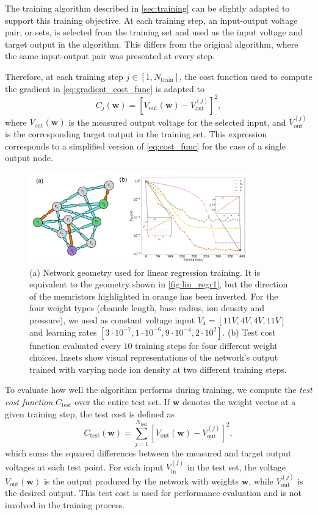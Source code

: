 \documentclass[reprint,superscriptaddress,prb,showkeys]{revtex4-2}
\begin{document}
The training algorithm described in \cref{sec:training} can be slightly adapted to support this training objective. At each training step, an input-output voltage pair, or sets, is selected from the training set and used as the input voltage and target output in the algorithm. This differs from the original algorithm, where the same input-output pair was presented at every step.

Therefore, at each training step $ j \in[1, N_{\text{train}}] $, the cost function used to compute the gradient in \cref{eq:gradient_cost_func} is adapted to
\[
C_j(\boldsymbol{w}) = \left[ V_{\text{out}}(\boldsymbol{w}) - V_{\text{out}}^{(j)} \right]^2,
\]
where $ V_{\text{out}}(\boldsymbol{w}) $ is the measured output voltage for the selected input, and $ V_{\text{out}}^{(j)} $ is the corresponding target output in the training set. This expression corresponds to a simplified version of \cref{eq:cost_func} for the case of a single output node.

\begin{figure}[t]
    \centering
    \includegraphics[width=0.85\textwidth]{plots/regression/regression_G00010002.pdf}
    \caption{(a) Network geometry used for linear regression training. It is equivalent to the geometry shown in \cref{fig:lin_regr1}, but the direction of the memristors highlighted in orange has been inverted. For the four weight types (channle length, base radius, ion density and pressure), we used as constant voltage input $V_4 = [11V,4V,4V,11V]$ and learning rates $[3\cdot 10^{-7}, 1\cdot 10^{-6}, 9\cdot 10^{-4}, 2\cdot 10^{2}]$. (b) Test cost function evaluated every $10$ training steps for four different weight choices. Insets show visual representations of the network’s output trained with varying node ion density at two different training steps.}\label{fig:lin_regr2}
\end{figure} 
To evaluate how well the algorithm performs during training, we compute the \emph{test cost function} $ C_{\text{test}} $ over the entire test set. If $ \boldsymbol{w} $ denotes the weight vector at a given training step, the test cost is defined as
\[
C_{\text{test}}\left( \boldsymbol{w} \right) = \sum_{j=1}^{N_{\text{test}}} \left[ V_{\text{out}}(\boldsymbol{w}) - V_{\text{out}}^{(j)} \right]^2,
\]
which sums the squared differences between the measured and target output voltages at each test point. For each input $V_{\text{in}}^{(j)}$ in the test set, the voltage $ V_{\text{out}}(\boldsymbol{w}) $ is the output produced by the network with weights $ \boldsymbol{w} $, while $ V_{\text{out}}^{(j)} $ is the desired output. This test cost is used for performance evaluation and is not involved in the training process.
\end{document}

